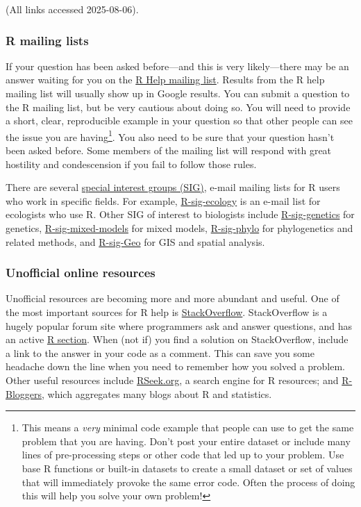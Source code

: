\documentclass[
  13,
  letterpaper,
]{report}
\begin{document}
(All links accessed 2025-08-06).

\subsubsection{R mailing lists}\label{sec-r-faq-help-mail}

If your question has been asked before---and this is very likely---there
may be an answer waiting for you on the
\href{https://www.r-project.org/mail.html}{R Help mailing list}. Results
from the R help mailing list will usually show up in Google results. You
can submit a question to the R mailing list, but be very cautious about
doing so. You will need to provide a short, clear, reproducible example
in your question so that other people can see the issue you are
having\footnote{This means a \emph{very} minimal code example that
  people can use to get the same problem that you are having. Don't post
  your entire dataset or include many lines of pre-processing steps or
  other code that led up to your problem. Use base R functions or
  built-in datasets to create a small dataset or set of values that will
  immediately provoke the same error code. Often the process of doing
  this will help you solve your own problem!}. You also need to be sure
that your question hasn't been asked before. Some members of the mailing
list will respond with great hostility and condescension if you fail to
follow those rules.

There are several \href{https://stat.ethz.ch/mailman/listinfo}{special
interest groups (SIG)}, e-mail mailing lists for R users who work in
specific fields. For example,
\href{https://stat.ethz.ch/mailman/listinfo/r-sig-ecology}{R-sig-ecology}
is an e-mail list for ecologists who use R. Other SIG of interest to
biologists include
\href{https://stat.ethz.ch/mailman/listinfo/r-sig-genetics}{R-sig-genetics}
for genetics,
\href{https://stat.ethz.ch/mailman/listinfo/r-sig-mixed-models}{R-sig-mixed-models}
for mixed models,
\href{https://stat.ethz.ch/mailman/listinfo/r-sig-phylo}{R-sig-phylo}
for phylogenetics and related methods, and
\href{https://stat.ethz.ch/mailman/listinfo/r-sig-geo}{R-sig-Geo} for
GIS and spatial analysis.

\subsubsection{Unofficial online resources}\label{sec-r-faq-help-unoff}

Unofficial resources are becoming more and more abundant and useful. One
of the most important sources for R help is
\href{https://stackoverflow.com}{StackOverflow}. StackOverflow is a
hugely popular forum site where programmers ask and answer questions,
and has an active \href{https://stackoverflow.com/questions/tagged/r}{R
section}. When (not if) you find a solution on StackOverflow, include a
link to the answer in your code as a comment. This can save you some
headache down the line when you need to remember how you solved a
problem. Other useful resources include
\href{https://rseek.org/}{RSeek.org}, a search engine for R resources;
and \href{https://www.r-bloggers.com/}{R-Bloggers}, which aggregates
many blogs about R and statistics.
\end{document}
